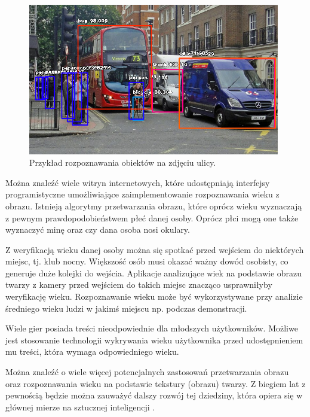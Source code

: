 \documentclass[a4paper,twoside,12pt]{book}
\begin{document}
    \begin{figure}
        \centering
        \includegraphics[width=11cm]{Obrazy/rozpoznawanieObiektow}
        \caption{Przykład rozpoznawania obiektów na zdjęciu ulicy. \cite{rozpoznawanieObiektow}}
        \label{fig.rozpoznawanieObiektow}
    \end{figure}

    Można znaleźć wiele witryn internetowych, które udostępniają interfejsy programistyczne umożliwiające zaimplementowanie
    rozpoznawania wieku z obrazu.
    Istnieją algorytmy przetwarzania obrazu, które oprócz wieku wyznaczają z pewnym prawdopodobieństwem płeć danej osoby.
    Oprócz płci mogą one także wyznaczyć minę oraz czy dana osoba nosi okulary.

    Z weryfikacją wieku danej osoby można się spotkać przed wejściem do niektórych miejsc, tj. klub nocny. Większość osób
    musi okazać ważny dowód osobisty,
    co generuje duże kolejki do wejścia. Aplikacje analizujące wiek na podstawie obrazu twarzy z kamery przed wejściem
    do takich miejsc znacząco usprawniłyby weryfikację wieku.
    Rozpoznawanie wieku może być wykorzystywane przy analizie średniego wieku ludzi w jakimś miejscu np. podczas demonstracji.

    Wiele gier posiada treści nieodpowiednie dla młodszych użytkowników. Możliwe jest stosowanie technologii wykrywania
    wieku użytkownika przed udostępnieniem mu treści, która wymaga odpowiedniego wieku.

    Można znaleźć o wiele więcej potencjalnych zastosowań przetwarzania obrazu oraz rozpoznawania wieku na podstawie
    tekstury (obrazu) twarzy. Z biegiem lat z pewnością będzie można zauważyć dalszy rozwój tej dziedziny, która
    opiera się w głównej mierze na sztucznej inteligencji \cite{computerVision}.
\end{document}
